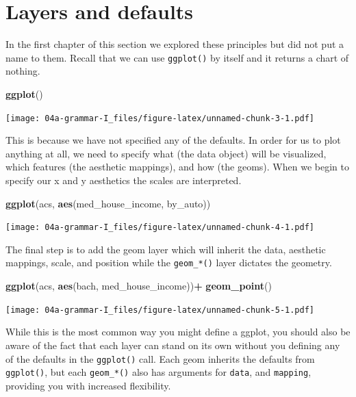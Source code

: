 \documentclass[
]{book}
\newenvironment{Shaded}{\begin{snugshade}}{\end{snugshade}}
\newcommand{\KeywordTok}[1]{\textcolor[rgb]{0.13,0.29,0.53}{\textbf{#1}}}
\newcommand{\NormalTok}[1]{#1}
\newcommand{\OperatorTok}[1]{\textcolor[rgb]{0.81,0.36,0.00}{\textbf{#1}}}
\newcommand{\StringTok}[1]{\textcolor[rgb]{0.31,0.60,0.02}{#1}}
\begin{document}
\hypertarget{layers-and-defaults}{%
\section{Layers and defaults}\label{layers-and-defaults}}

In the first chapter of this section we explored these principles but did not put a name to them. Recall that we can use \texttt{ggplot()} by itself and it returns a chart of nothing.

\begin{Shaded}
\begin{Highlighting}[]
\KeywordTok{ggplot}\NormalTok{()}
\end{Highlighting}
\end{Shaded}

\texttt{[image: 04a-grammar-I\_files/figure-latex/unnamed-chunk-3-1.pdf]}

This is because we have not specified any of the defaults. In order for us to plot anything at all, we need to specify what (the data object) will be visualized, which features (the aesthetic mappings), and how (the geoms). When we begin to specify our x and y aesthetics the scales are interpreted.

\begin{Shaded}
\begin{Highlighting}[]
\KeywordTok{ggplot}\NormalTok{(acs, }\KeywordTok{aes}\NormalTok{(med\_house\_income, by\_auto))}
\end{Highlighting}
\end{Shaded}

\texttt{[image: 04a-grammar-I\_files/figure-latex/unnamed-chunk-4-1.pdf]}

The final step is to add the geom layer which will inherit the data, aesthetic mappings, scale, and position while the \texttt{geom\_*()} layer dictates the geometry.

\begin{Shaded}
\begin{Highlighting}[]
\KeywordTok{ggplot}\NormalTok{(acs, }\KeywordTok{aes}\NormalTok{(bach, med\_house\_income))}\OperatorTok{+}\StringTok{ }
\StringTok{  }\KeywordTok{geom\_point}\NormalTok{()}
\end{Highlighting}
\end{Shaded}

\texttt{[image: 04a-grammar-I\_files/figure-latex/unnamed-chunk-5-1.pdf]}

While this is the most common way you might define a ggplot, you should also be aware of the fact that each layer can stand on its own without you defining any of the defaults in the \texttt{ggplot()} call. Each geom inherits the defaults from \texttt{ggplot()}, but each \texttt{geom\_*()} also has arguments for \texttt{data}, and \texttt{mapping}, providing you with increased flexibility.
\end{document}
